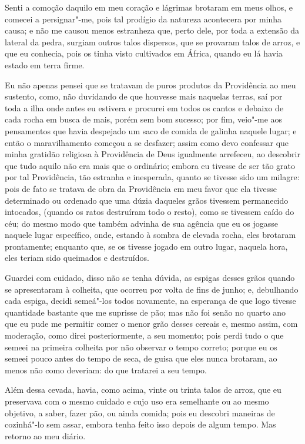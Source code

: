 Senti a comoção daquilo em meu coração e lágrimas brotaram em meus
olhos, e comecei a persignar"-me, pois tal prodígio da natureza
acontecera por minha causa; e não me causou menos estranheza que, perto
dele, por toda a extensão da lateral da pedra, surgiam outros talos
dispersos, que se provaram talos de arroz, e que eu conhecia, pois os
tinha visto cultivados em África, quando eu lá havia estado em terra
firme.

Eu não apenas pensei que se tratavam de puros produtos da Providência ao
meu sustento, como, não duvidando de que houvesse mais naquelas terras,
saí por toda a ilha onde antes eu estivera e procurei em todos os cantos
e debaixo de cada rocha em busca de mais, porém sem bom sucesso; por
fim, veio"-me aos pensamentos que havia despejado um saco de comida de
galinha naquele lugar; e então o maravilhamento começou a se desfazer;
assim como devo confessar que minha gratidão religiosa à Providência de
Deus igualmente arrefeceu, ao descobrir que tudo aquilo não era mais que
o ordinário; embora eu tivesse de ser tão grato por tal Providência, tão
estranha e inesperada, quanto se tivesse sido um milagre: pois de fato
se tratava de obra da Providência em meu favor que ela tivesse
determinado ou ordenado que uma dúzia daqueles grãos tivessem
permanecido intocados, (quando os ratos destruíram todo o resto), como
se tivessem caído do céu; do mesmo modo que também advinha de sua
agência que eu os jogasse naquele lugar específico, onde, estando à
sombra de elevada rocha, eles brotaram prontamente; enquanto que, se os
tivesse jogado em outro lugar, naquela hora, eles teriam sido queimados
e destruídos.

Guardei com cuidado, disso não se tenha dúvida, as espigas desses grãos
quando se apresentaram à colheita, que ocorreu por volta de fins de
junho; e, debulhando cada espiga, decidi semeá"-los todos novamente, na
esperança de que logo tivesse quantidade bastante que me suprisse de
pão; mas não foi senão no quarto ano que eu pude me permitir comer o
menor grão desses cereais e, mesmo assim, com moderação, como direi
posteriormente, a seu momento; pois perdi tudo o que semeei na primeira
colheita por não observar o tempo correto; porque eu os semeei pouco
antes do tempo de seca, de guisa que eles nunca brotaram, ao menos não
como deveriam: do que tratarei a seu tempo.

Além dessa cevada, havia, como acima, vinte ou trinta talos de arroz,
que eu preservava com o mesmo cuidado e cujo uso era semelhante ou ao
mesmo objetivo, a saber, fazer pão, ou ainda comida; pois eu descobri
maneiras de cozinhá"-lo sem assar, embora tenha feito isso depois de
algum tempo. Mas retorno ao meu diário.

